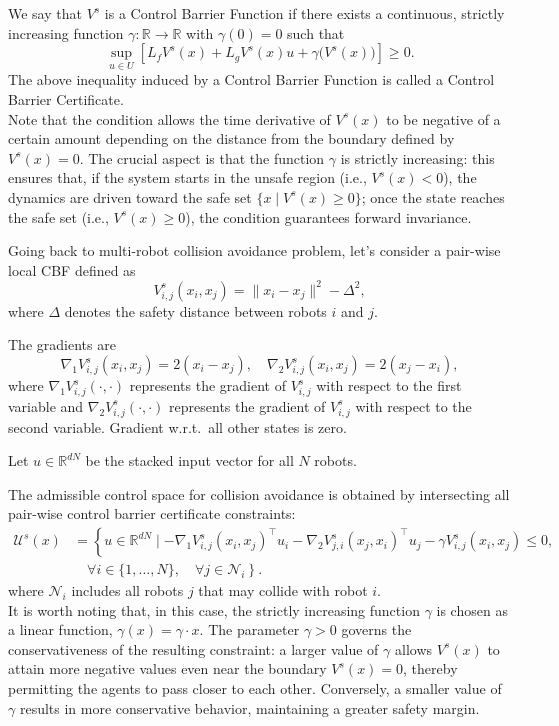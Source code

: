 We say that $V^s$ is a Control Barrier Function if there exists a continuous, strictly increasing function $\gamma : \mathbb{R} \to \mathbb{R}$ with $\gamma(0) = 0$ such that
\[
\sup_{u \in U} \left[ L_f V^s(x) + L_g V^s(x) u + \gamma\bigl(V^s(x)\bigr) \right] \geq 0.
\]
The above inequality induced by a Control Barrier Function is called a Control Barrier Certificate. \\
Note that the condition allows the time derivative of \( V^s(x) \) to be negative of a certain amount depending on the distance from the boundary defined by \( V^s(x) = 0 \). The crucial aspect is that the function \( \gamma \) is strictly increasing: this ensures that, if the system starts in the unsafe region (i.e., \( V^s(x) < 0 \)), the dynamics are driven toward the safe set \( \{ x \mid V^s(x) \geq 0 \} \); once the state reaches the safe set (i.e., \( V^s(x) \geq 0 \)), the condition guarantees forward invariance.

Going back to multi-robot collision avoidance problem, let's consider a pair-wise local CBF defined as
\[
V^s_{i,j}(x_i, x_j) = \|x_i - x_j\|^2 - \Delta^2,
\]
where $\Delta$ denotes the safety distance between robots $i$ and $j$.

The gradients are
\[
\nabla_1 V^s_{i,j}(x_i, x_j) = 2(x_i - x_j), \quad \nabla_2 V^s_{i,j}(x_i, x_j) = 2(x_j - x_i),
\]
where $\nabla_1 V^s_{i,j}(\cdot, \cdot)$ represents the gradient of $V^s_{i,j}$ with respect to the first variable and $\nabla_2 V^s_{i,j}(\cdot, \cdot)$ represents the gradient of $V^s_{i,j}$ with respect to the second variable. Gradient w.r.t.\ all other states is zero.

Let $u \in \mathbb{R}^{dN}$ be the stacked input vector for all $N$ robots.

The admissible control space for collision avoidance is obtained by intersecting all pair-wise control barrier certificate constraints:
\begin{align*}
    \mathcal{U}^s(x) &= \left\{ u \in \mathbb{R}^{dN} \mid 
    -\nabla_1 V^s_{i,j}(x_i, x_j)^\top u_i - \nabla_2 V^s_{j,i}(x_j, x_i)^\top u_j - \gamma V^s_{i,j}(x_i, x_j) \leq 0, \right. \\
    & \quad \left. \forall i \in \{1,\ldots,N\}, \quad \forall j \in \mathcal{N}_i \right\}.
\end{align*}
where $\mathcal{N}_i$ includes all robots $j$ that may collide with robot $i$. \\
It is worth noting that, in this case, the strictly increasing function \( \gamma \) is chosen as a linear function, \( \gamma(x) = \gamma \cdot x \). The parameter \( \gamma > 0 \) governs the conservativeness of the resulting constraint: a larger value of \( \gamma \) allows \( V^s(x) \) to attain more negative values even near the boundary \( V^s(x) = 0 \), thereby permitting the agents to pass closer to each other. Conversely, a smaller value of \( \gamma \) results in more conservative behavior, maintaining a greater safety margin. 

